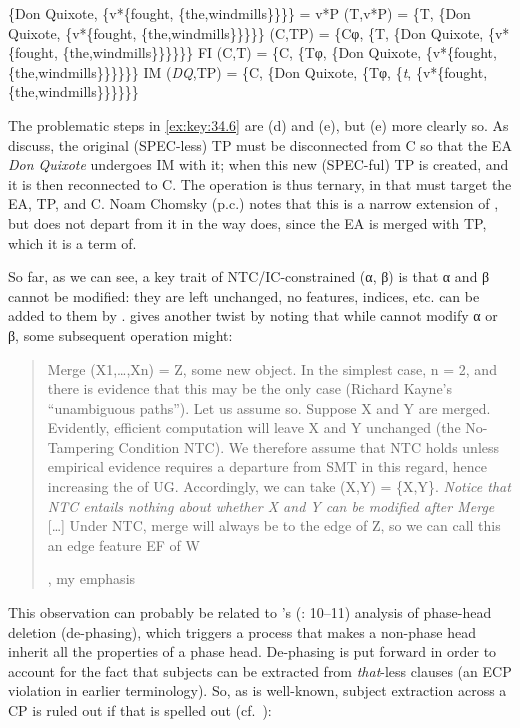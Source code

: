 \documentclass[output=paper]{langsci/langscibook}
\begin{document}
\ea%
    \label{ex:key:34.6}
	\ea \{Don Quixote, \{v*\{fought, \{the,windmills\}\}\}\} = v*P
	\ex {} (T,v*P) = \{T, \{Don Quixote, \{v*\{fought, \{the,windmills\}\}\}\}\}
	\ex {} (C,TP) = \{Cφ, \{T, \{Don Quixote, \{v*\{fought, \{the,windmills\}\}\}\}\}\}
	\ex \gls{FI} (C,T) = \{C, \{Tφ, \{Don Quixote, \{v*\{fought, \{the,windmills\}\}\}\}\}\}
    \ex \gls{IM} (\emph{DQ},TP) = \{C, \{Don Quixote, \{Tφ, \{\emph{t}, \{v*\{fought, \{the,windmills\}\}\}\}\}\}
	\z
\z

The problematic steps in \eqref{ex:key:34.6} are (d) and (e), but (e) more
clearly so. As \citet{EKS2012} discuss, the original (SPEC-less) TP must be
disconnected from C so that the \gls{EA} \emph{Don Quixote} undergoes \gls{IM}
with it; when this new (SPEC-ful) TP is created, and it is then reconnected to
C. The operation is thus ternary, in that  must target the \gls{EA}, TP,
and C.  Noam Chomsky (p.c.) notes that this is a narrow extension of , but
does not depart from it in the way  does, since the \gls{EA} is
merged with TP, which it is a term of.

So far, as we can see, a key trait of \gls{NTC}/\gls{IC}-constrained 
(α, β) is that α and β cannot be modified: they are left unchanged, no features,
indices, etc. can be added to them by . \citet{Chomsky2007} gives another
twist by noting that while  cannot modify α or β, some subsequent
operation might:

\blockquote[{\citealt[8]{Chomsky2007}, my emphasis}][.]{Merge
    (X1,\dots{},Xn) = Z, some new object. In the simplest case, n = 2, and
    there is evidence that this may be the only case (Richard Kayne’s
    “unambiguous paths”). Let us assume so. Suppose X and Y are merged.
    Evidently, efficient computation will leave X and Y unchanged (the
    No-Tampering Condition \gls{NTC}). We therefore assume that \gls{NTC} holds
    unless empirical evidence requires a departure from \gls{SMT} in this
    regard, hence increasing the  of \gls{UG}. Accordingly, we can
    take  (X,Y) = \{X,Y\}. \emph{Notice that \gls{NTC} entails nothing
    about whether X and Y can be modified after Merge} [\dots{}] Under \gls{NTC},
    merge will always be to the edge of Z, so we can call this an edge feature
\gls{EF} of W}

This observation can probably be related to \citeauthor{Chomsky2015}’s
(\citeyear{Chomsky2015}: 10--11) analysis of phase-head deletion (de-phasing),
which triggers a process that makes a non-phase head inherit all the properties
of a phase head.  De-phasing is put forward in order to account for the fact
that subjects can be extracted from \emph{that}{}-less clauses (an \gls{ECP}
violation in earlier terminology). So, as is well-known, subject extraction
across a CP is ruled out if that is spelled out
(cf.~\citealt{Chomsky1986,Rizzi1990}):
\end{document}
